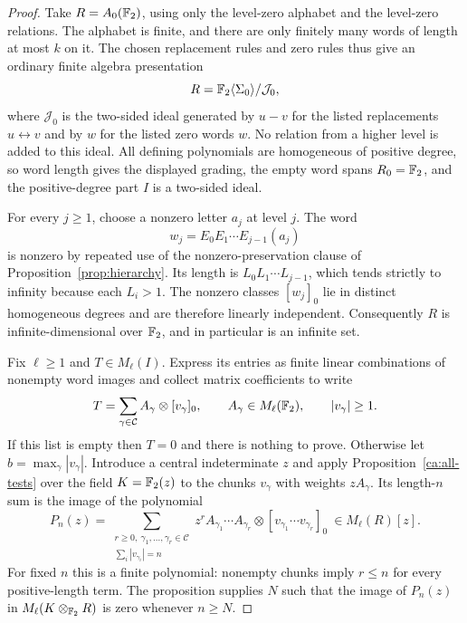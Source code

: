 \begin{proof}
Take $R=A_0(\mathbb F_2)$, using only the level-zero alphabet and the level-zero
relations.  The alphabet is finite, and there are only finitely many
words of length at most $k$ on it.  The chosen replacement rules and
zero rules thus give an ordinary finite algebra presentation
\[
  R=\mathbb F_2\langle\Sigma_0\rangle/\mathcal J_0,
\]
where $\mathcal J_0$ is the two-sided ideal generated by $u-v$ for the
listed replacements $u\leftrightarrow v$ and by $w$ for the listed zero
words $w$.  No relation from a higher level is added to this ideal.  All
defining polynomials are homogeneous of positive degree, so word length
gives the displayed grading, the empty word spans $R_0=\mathbb F_2$, and the
positive-degree part $I$ is a two-sided ideal.

For every $j\geq1$, choose a nonzero letter $a_j$ at level $j$.  The word
\[
  w_j=E_0E_1\cdots E_{j-1}(a_j)
\]
is nonzero by repeated use of the nonzero-preservation clause of
Proposition~\ref{prop:hierarchy}.  Its length is
$L_0L_1\cdots L_{j-1}$, which tends strictly to infinity because each
$L_i>1$.  The nonzero classes $[w_j]_0$ lie in distinct homogeneous
degrees and are therefore linearly independent.  Consequently $R$ is
infinite-dimensional over $\mathbb F_2$, and in particular is an infinite set.

Fix $\ell\geq1$ and $T\in M_\ell(I)$.  Express its entries as finite
linear combinations of nonempty word images and collect matrix
coefficients to write
\begin{equation}
  T=\sum_{\gamma\in\mathcal C}
       A_\gamma\otimes[v_\gamma]_0,
  \qquad A_\gamma\in M_\ell(\mathbb F_2),\qquad |v_\gamma|\geq1.
  \label{ca:T-expansion}
\end{equation}
If this list is empty then $T=0$ and there is nothing to prove.
Otherwise let $b=\max_\gamma|v_\gamma|$.  Introduce a central
indeterminate $z$ and apply Proposition~\ref{ca:all-tests} over the field
$K=\mathbb F_2(z)$ to the chunks $v_\gamma$ with weights $zA_\gamma$.
Its length-$n$ sum is the image of the polynomial
\begin{equation}
  P_n(z)=
  \sum_{\substack{r\geq0,\ \gamma_1,\ldots,\gamma_r\in\mathcal C\\
                   \sum_i|v_{\gamma_i}|=n}}
    z^r A_{\gamma_1}\cdots A_{\gamma_r}
         \otimes[v_{\gamma_1}\cdots v_{\gamma_r}]_0
     \ \in M_\ell(R)[z].
  \label{ca:length-polynomial}
\end{equation}
For fixed $n$ this is a finite polynomial: nonempty chunks imply $r\leq n$
for every positive-length term.  The proposition supplies $N$ such that
the image of $P_n(z)$ in $M_\ell(K\otimes_{\mathbb F_2}R)$ is zero whenever
$n\geq N$.


\end{proof}
